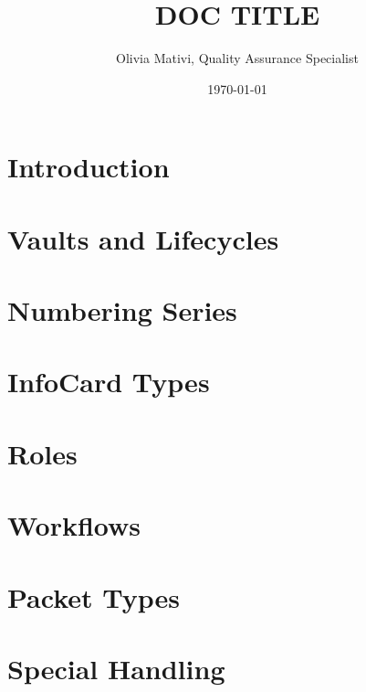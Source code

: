 \documentclass{article}
\title{DOC TITLE}
\author{Olivia Mativi, Quality Assurance Specialist}
\date{\today}
\begin{document}
\maketitle

\tableofcontents

\section{Introduction}
\section{Vaults and Lifecycles}
\section{Numbering Series}
\section{InfoCard Types}
\section{Roles}
\section{Workflows}
\section{Packet Types}
\section{Special Handling}
\end{document}
